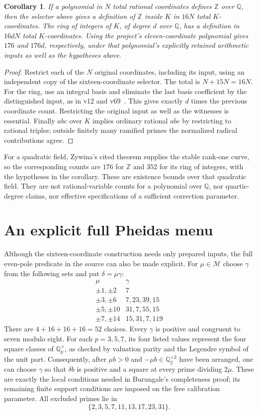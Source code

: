 \documentclass[11pt,a4paper]{article}
\newtheorem{corollary}[theorem]{Corollary}
\newcommand{\Q}{\mathbb Q}\newcommand{\Z}{\mathbb Z}
\begin{document}
\begin{corollary}\label{cor:composition}
If a polynomial in $N$ total rational coordinates defines $\Z$ over
$\Q$, then the selector above gives a definition of $\Z$ inside $K$
in $16N$ total $K$-coordinates. The ring of integers of $K$, of degree
$d$ over $\Q$, has a definition in $16dN$ total $K$-coordinates.
Using the project's eleven-coordinate polynomial gives $176$ and
$176d$, respectively, under that polynomial's explicitly retained
arithmetic inputs as well as the hypotheses above.
\end{corollary}
\begin{proof}
Restrict each of the $N$ original coordinates, including its input,
using an independent copy of the sixteen-coordinate selector. The
total is $N+15N=16N$. For the ring, use an integral basis and eliminate
the last basis coefficient by the distinguished input, as in v12
and v69~\cite{v12,v69}. This gives exactly $d$ times the previous
coordinate count. Restricting the original input as well as the
witnesses is essential. Finally $abc$ over $K$ implies ordinary
rational $abc$ by restricting to rational triples; outside finitely
many ramified primes the normalized radical contributions agree.
\end{proof}

For a quadratic field, Zywina's cited theorem supplies the stable
rank-one curve, so the corresponding counts are $176$ for $\Z$ and
$352$ for its ring of integers, with the hypotheses in the corollary.
These are existence bounds over that quadratic field. They are not
rational-variable counts for a polynomial over $\Q$, nor quartic-degree
claims, nor effective specifications of a sufficient correction parameter.

\section{An explicit full Pheidas menu}

Although the sixteen-coordinate construction needs only prepared inputs,
the full even-pole predicate in the source can also be made explicit.
For $\mu\in\mathcal M$ choose $\gamma$ from the following sets and put
$\delta=\mu\gamma$:
\[
\begin{array}{c|c}
\mu&\gamma\\\hline
\pm1,\pm2&7\\
\pm3,\pm6&7,23,39,15\\
\pm5,\pm10&31,7,55,15\\
\pm7,\pm14&15,31,7,119
\end{array}
\]
There are $4+16+16+16=52$ choices. Every $\gamma$ is positive and
congruent to seven modulo eight. For each $p=3,5,7$, its four listed
values represent the four square classes of $\Q_p^\times$, as checked
by valuation parity and the Legendre symbol of the unit part.
Consequently, after $\mu b>0$ and $-\mu b\in\Q_2^{\times2}$ have
been arranged, one can choose $\gamma$ so that $\delta b$ is positive
and a square at every prime dividing $2\mu$. These are exactly the
local conditions needed in Burungale's completeness proof; its remaining
finite support conditions are imposed on the free calibration parameter.
All excluded primes lie in
\[
                     \{2,3,5,7,11,13,17,23,31\}.
\]
\end{document}

